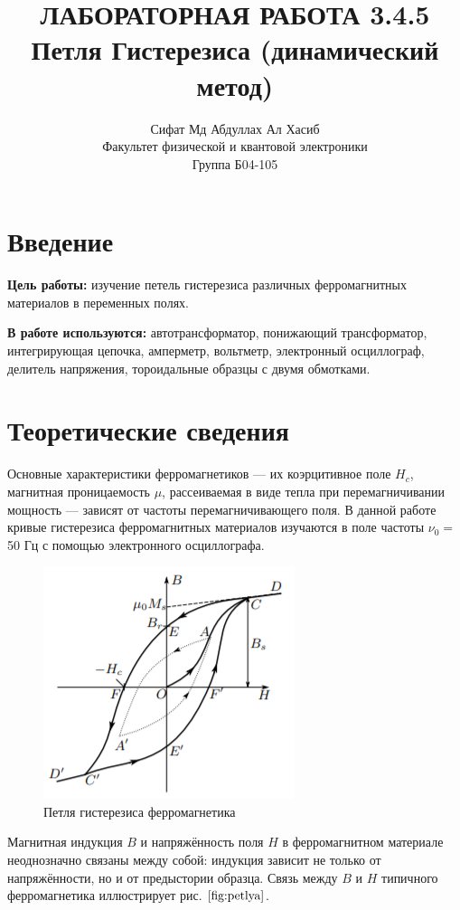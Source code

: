 \documentclass[a4paper,12pt]{article} %
\author{Сифат Мд Абдуллах Ал Хасиб\\
Факультет физической и квантовой электроники \\
Группа Б04-105}
\title{\textbf{ЛАБОРАТОРНАЯ РАБОТА 3.4.5 \\ Петля Гистерезиса (динамический метод)}}
\begin{document}
\maketitle
\section{Введение}

\textbf{Цель работы:} изучение петель гистерезиса различных ферромагнитных
материалов в переменных полях.

\textbf{В работе используются:} автотрансформатор, понижающий трансформатор, интегрирующая цепочка, амперметр, вольтметр, электронный
осциллограф, делитель напряжения, тороидальные образцы с двумя обмотками.


\section{Теоретические сведения}

Основные характеристики
ферромагнетиков — их коэрцитивное поле $H_c$, магнитная проницаемость
$\mu$, рассеиваемая в виде тепла при перемагничивании мощность — зависят
от частоты перемагничивающего поля. В данной работе кривые гистерезиса ферромагнитных материалов изучаются в поле частоты $\nu_0 =$ 50 Гц
с помощью электронного осциллографа.
\begin{figure}[H]
	\centering
	\includegraphics{petlya.png}
	\caption{Петля гистерезиса ферромагнетика}
	\label{fig:petlya}
\end{figure}

Магнитная индукция $ B $ и напряжённость поля $ H $ в ферромагнитном материале неоднозначно связаны между собой: индукция зависит
не только от напряжённости, но и от предыстории образца. Связь между $ B $ и $ H $ типичного ферромагнетика иллюстрирует рис. $\ref{fig:petlya}$.
\end{document}
